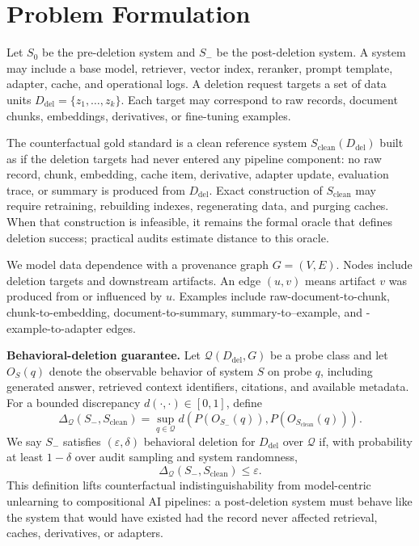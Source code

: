 \section{Problem Formulation}

Let $S_0$ be the pre-deletion system and $S_-$ be the post-deletion system. A system may include a base model, retriever, vector index, reranker, prompt template, adapter, cache, and operational logs. A deletion request targets a set of data units $D_{\mathrm{del}}=\{z_1,\ldots,z_k\}$. Each target may correspond to raw records, document chunks, embeddings, derivatives, or fine-tuning examples.

The counterfactual gold standard is a clean reference system $S_{\mathrm{clean}}(D_{\mathrm{del}})$ built as if the deletion targets had never entered any pipeline component: no raw record, chunk, embedding, cache item, derivative, adapter update, evaluation trace, or summary is produced from $D_{\mathrm{del}}$. Exact construction of $S_{\mathrm{clean}}$ may require retraining, rebuilding indexes, regenerating data, and purging caches. When that construction is infeasible, it remains the formal oracle that defines deletion success; practical audits estimate distance to this oracle.

We model data dependence with a provenance graph $G=(V,E)$. Nodes include deletion targets and downstream artifacts. An edge $(u,v)$ means artifact $v$ was produced from or influenced by $u$. Examples include raw-document-to-chunk, chunk-to-embedding, document-to-summary, summary-to--example, and -example-to-adapter edges.

\textbf{Behavioral-deletion guarantee.}
Let $\mathcal{Q}(D_{\mathrm{del}},G)$ be a probe class and let $O_S(q)$ denote the observable behavior of system $S$ on probe $q$, including generated answer, retrieved context identifiers, citations, and available metadata. For a bounded discrepancy $d(\cdot,\cdot)\in[0,1]$, define
\[
\Delta_{\mathcal{Q}}(S_-,S_{\mathrm{clean}})
=
\sup_{q\in\mathcal{Q}}
d\!\left(P(O_{S_-}(q)),P(O_{S_{\mathrm{clean}}}(q))\right).
\]
We say $S_-$ satisfies $(\varepsilon,\delta)$ behavioral deletion for $D_{\mathrm{del}}$ over $\mathcal{Q}$ if, with probability at least $1-\delta$ over audit sampling and system randomness,
\[
\Delta_{\mathcal{Q}}(S_-,S_{\mathrm{clean}})\leq \varepsilon.
\]
This definition lifts counterfactual indistinguishability from model-centric unlearning to compositional AI pipelines: a post-deletion system must behave like the system that would have existed had the record never affected retrieval, caches, derivatives, or adapters.

